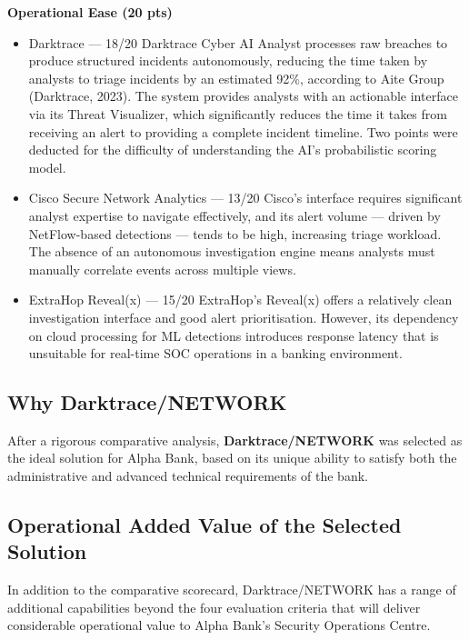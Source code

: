 \documentclass[12pt,a4paper]{report}
\begin{document}
\noindent \textbf{Operational Ease (20 pts)}
\begin{itemize}
    \item Darktrace — 18/20 Darktrace Cyber AI Analyst processes raw breaches to produce structured incidents autonomously, reducing the time taken by analysts to triage incidents by an estimated 92\%, according to Aite Group (Darktrace, 2023). The system provides analysts with an actionable interface via its Threat Visualizer, which significantly reduces the time it takes from receiving an alert to providing a complete incident timeline. Two points were deducted for the difficulty of understanding the AI's probabilistic scoring model.

    \item Cisco Secure Network Analytics — 13/20 Cisco's interface requires significant analyst expertise to navigate effectively, and its alert volume — driven by NetFlow-based detections — tends to be high, increasing triage workload. The absence of an autonomous investigation engine means analysts must manually correlate events across multiple views.

    \item ExtraHop Reveal(x) — 15/20 ExtraHop's Reveal(x) offers a relatively clean investigation interface and good alert prioritisation. However, its dependency on cloud processing for ML detections introduces response latency that is unsuitable for real-time SOC operations in a banking environment.
\end{itemize}




\subsection{Why Darktrace/NETWORK}

After a rigorous comparative analysis, \textbf{Darktrace/NETWORK} was selected as the
ideal solution for Alpha Bank, based on its unique ability to satisfy both the administrative
and advanced technical requirements of the bank.

\subsection*{Operational Added Value of the Selected Solution}

In addition to the comparative scorecard, Darktrace/NETWORK has a range of additional capabilities beyond the four evaluation criteria that will deliver considerable operational value to Alpha Bank's Security Operations Centre.\\
\end{document}
